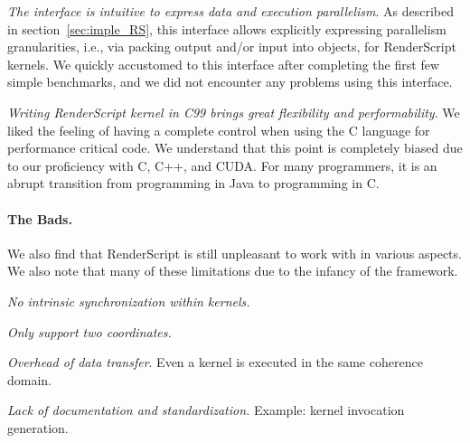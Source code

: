 \textit{The  interface is intuitive to express data and
execution parallelism}. As described in section~\ref{sec:imple_RS}, this
 interface allows explicitly expressing parallelism
granularities, i.e., via packing output and/or input into  objects,
for RenderScript kernels.  We quickly accustomed to this interface
after completing the first few simple benchmarks, and we did not encounter
any problems using this interface.

\textit{Writing RenderScript kernel in C99 brings great flexibility and
performability}. We liked the feeling of having a complete control when using
the C language for performance critical code. We understand that this point is
completely biased due to our proficiency with C, C++, and CUDA. For many
programmers, it is an abrupt transition from programming in Java to programming
in C.


\paragraph{The Bads.} We also find that RenderScript is still unpleasant to work
with in various aspects. We also note that many of these limitations due to the
infancy of the framework.

\textit{No intrinsic synchronization within kernels.}

\textit{Only support two coordinates.}

\textit{Overhead of data transfer}. Even a kernel is executed in the same
coherence domain.

\textit{Lack of documentation and standardization.} Example: kernel invocation generation.


